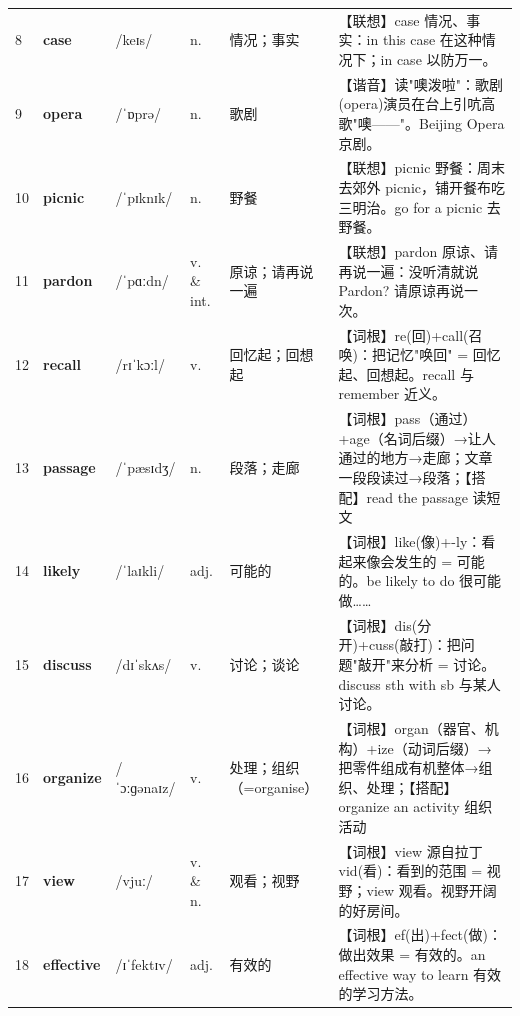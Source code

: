\documentclass[UTF8,a4paper,11pt,oneside]{ctexbook}
\newcommand{\cellword}[1]{{\bfseries\textcolor{wordcol}{#1}}}
\newcommand{\cellipa}[1]{{\footnotesize\textcolor{ipacol}{#1}}}
\newcommand{\cellpos}[1]{\textcolor{poscol}{#1}}
\newcommand{\cellno}[1]{\textcolor{volcolor!75!black}{#1}}
\begin{document}
{\begin{longtable}{@{}C{0.045\textwidth}L{0.155\textwidth}L{0.175\textwidth}C{0.070\textwidth}L{0.180\textwidth}L{0.282\textwidth}@{}}
\cellno{8} & \cellword{case} & \cellipa{/keɪs/} & \cellpos{n.} & 情况；事实 & \textcolor{tagAssoc}{【联想】}case 情况、事实：in this case 在这种情况下；in case 以防万一。 \\
 \cellno{9} & \cellword{opera} & \cellipa{/ˈɒprə/} & \cellpos{n.} & 歌剧 & \textcolor{tagSound}{【谐音】}读"噢泼啦"：歌剧(opera)演员在台上引吭高歌"噢——"。Beijing Opera 京剧。 \\
\cellno{10} & \cellword{picnic} & \cellipa{/ˈpɪknɪk/} & \cellpos{n.} & 野餐 & \textcolor{tagAssoc}{【联想】}picnic 野餐：周末去郊外 picnic，铺开餐布吃三明治。go for a picnic 去野餐。 \\
 \cellno{11} & \cellword{pardon} & \cellipa{/ˈpɑːdn/} & \cellpos{v.  \& int.} & 原谅；请再说一遍 & \textcolor{tagAssoc}{【联想】}pardon 原谅、请再说一遍：没听清就说 Pardon? 请原谅再说一次。 \\
\cellno{12} & \cellword{recall} & \cellipa{/rɪˈkɔːl/} & \cellpos{v.} & 回忆起；回想起 & \textcolor{tagRoot}{【词根】}re(回)+call(召唤)：把记忆"唤回" = 回忆起、回想起。recall 与 remember 近义。 \\
 \cellno{13} & \cellword{passage} & \cellipa{/ˈpæsɪdʒ/} & \cellpos{n.} & 段落；走廊 & \textcolor{tagRoot}{【词根】}pass（通过）+age（名词后缀）→\allowbreak{}让人通过的地方→\allowbreak{}走廊；文章一段段读过→\allowbreak{}段落；\textcolor{tagColloc}{【搭配】}read the passage 读短文 \\
\cellno{14} & \cellword{likely} & \cellipa{/ˈlaɪkli/} & \cellpos{adj.} & 可能的 & \textcolor{tagRoot}{【词根】}like(像)+-ly：看起来像会发生的 = 可能的。be likely to do 很可能做…… \\
 \cellno{15} & \cellword{discuss} & \cellipa{/dɪˈskʌs/} & \cellpos{v.} & 讨论；谈论 & \textcolor{tagRoot}{【词根】}dis(分开)+cuss(敲打)：把问题"敲开"来分析 = 讨论。discuss sth with sb 与某人讨论。 \\
\cellno{16} & \cellword{organize} & \cellipa{/ˈɔːɡənaɪz/} & \cellpos{v.} & 处理；组织（=organise） & \textcolor{tagRoot}{【词根】}organ（器官、机构）+ize（动词后缀）→\allowbreak{}把零件组成有机整体→\allowbreak{}组织、处理；\textcolor{tagColloc}{【搭配】}organize an activity 组织活动 \\
 \cellno{17} & \cellword{view} & \cellipa{/vjuː/} & \cellpos{v.  \& n.} & 观看；视野 & \textcolor{tagRoot}{【词根】}view 源自拉丁 vid(看)：看到的范围 = 视野；view 观看。视野开阔的好房间。 \\
\cellno{18} & \cellword{effective} & \cellipa{/ɪˈfektɪv/} & \cellpos{adj.} & 有效的 & \textcolor{tagRoot}{【词根】}ef(出)+fect(做)：做出效果 = 有效的。an effective way to learn 有效的学习方法。 \\

\end{longtable}}
\end{document}
